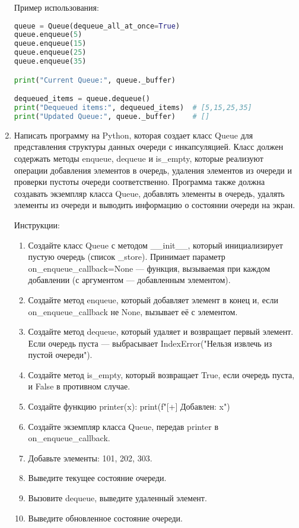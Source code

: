 \begin{enumerate}
Пример использования:
\begin{lstlisting}[language=Python]
queue = Queue(dequeue_all_at_once=True)
queue.enqueue(5)
queue.enqueue(15)
queue.enqueue(25)
queue.enqueue(35)

print("Current Queue:", queue._buffer)

dequeued_items = queue.dequeue()
print("Dequeued items:", dequeued_items)  # [5,15,25,35]
print("Updated Queue:", queue._buffer)    # []
\end{lstlisting}

\item Написать программу на Python, которая создает класс Queue для представления структуры данных очереди с инкапсуляцией. Класс должен содержать методы enqueue, dequeue и is\_empty, которые реализуют операции добавления элементов в очередь, удаления элементов из очереди и проверки пустоты очереди соответственно. Программа также должна создавать экземпляр класса Queue, добавлять элементы в очередь, удалять элементы из очереди и выводить информацию о состоянии очереди на экран.

Инструкции:
\begin{enumerate}
    \item Создайте класс Queue с методом \_\_init\_\_, который инициализирует пустую очередь (список \_store). Принимает параметр on\_enqueue\_callback=None — функция, вызываемая при каждом добавлении (с аргументом — добавленным элементом).
    \item Создайте метод enqueue, который добавляет элемент в конец и, если on\_enqueue\_callback не None, вызывает её с элементом.
    \item Создайте метод dequeue, который удаляет и возвращает первый элемент. Если очередь пуста — выбрасывает IndexError("Нельзя извлечь из пустой очереди").
    \item Создайте метод is\_empty, который возвращает True, если очередь пуста, и False в противном случае.
    \item Создайте функцию printer(x): print(f"[+] Добавлен: {x}")
    \item Создайте экземпляр класса Queue, передав printer в on\_enqueue\_callback.
    \item Добавьте элементы: 101, 202, 303.
    \item Выведите текущее состояние очереди.
    \item Вызовите dequeue, выведите удаленный элемент.
    \item Выведите обновленное состояние очереди.
\end{enumerate}


\end{enumerate}
